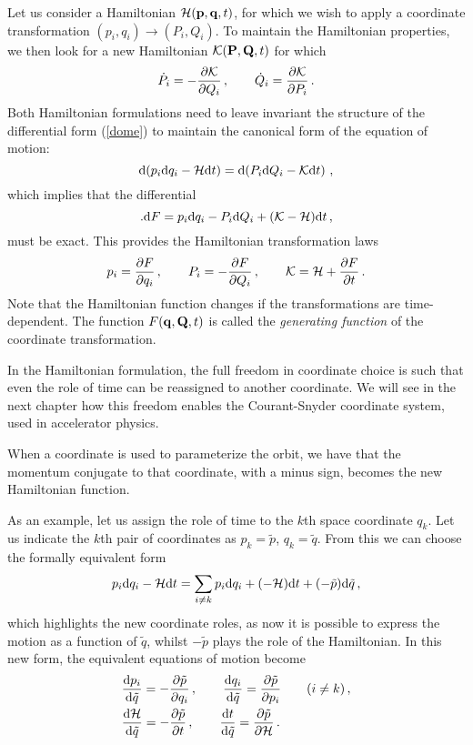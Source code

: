 Let us consider a Hamiltonian $\mathcal{H}(\vb{p},\vb{q},t)$, for which we wish to apply a coordinate transformation $(p_i,q_i)\to(P_i,Q_i)$. To maintain the Hamiltonian properties, we then look for a new Hamiltonian $\mathcal{K}(\vb{P},\vb{Q},t)$ for which
%
\begin{equation}
    \dot P_i = -\pdv{\mathcal{K}}{Q_i}\,, \qquad \dot Q_i = \pdv{\mathcal{K}}{P_i}\,.
\end{equation}
%
Both Hamiltonian formulations need to leave invariant the structure of the differential form (\ref{dome}) to maintain the canonical form of the equation of motion:
%
\begin{equation}
    \dd (p_i \dd q_i- \mathcal{H} \dd t) = \dd(P_i \dd Q_i - \mathcal{K}\dd t)\,,
\end{equation}
%
which implies that the differential
%
\begin{equation}.
    \dd F = p_i\dd q_i - P_i \dd Q_i + (\mathcal{K}-\mathcal{H})\dd t\, ,
\end{equation}
%
must be exact. This provides the Hamiltonian transformation laws
%
\begin{equation} 
	p_i = \pdv{F}{q_i}\,, \qquad P_i = -\pdv{F}{Q_i}\,, \qquad \mathcal{K}=\mathcal{H}+\pdv{F}{t}\,.
\end{equation}
%
Note that the Hamiltonian function changes if the transformations are time-dependent. The function $F(\vb{q},\vb{Q},t)$ is called the \textit{generating function} of the coordinate transformation.

In the Hamiltonian formulation, the full freedom in coordinate choice is such that even the role of time can be reassigned to another coordinate. We will see in the next chapter how this freedom enables the Courant-Snyder coordinate system, used in accelerator physics.

When a coordinate is used to parameterize the orbit, we have that the momentum conjugate to that coordinate, with a minus sign, becomes the new Hamiltonian function.

As an example, let us assign the role of time to the $k$th space coordinate $q_k$. Let us indicate the $k$th pair of coordinates as $p_k = \tilde p$, $q_k=\tilde q$. From this we can choose the formally equivalent form
%
\begin{equation}
    p_i \dd q_i - \mathcal{H} \dd t = \sum_{i\neq k} p_i \dd q_i + (-\mathcal{H})\dd t + (-\tilde p)\dd\tilde q\,,
\end{equation}
%
which highlights the new coordinate roles, as now it is possible to express the motion as a function of $\tilde q$, whilst $-\tilde p$ plays the role of the Hamiltonian. In this new form, the equivalent equations of motion become
%
\begin{equation} 
\begin{split}
	&\dv{p_i}{\tilde q} = -\pdv{\tilde p}{q_i}\,, \qquad \dv{q_i}{\tilde q} = \pdv{\tilde p}{p_i} \qquad (i\neq k)\,, \\
	&\dv{\mathcal{H}}{\tilde q} = -\pdv{\tilde p}{t}\,,  \qquad \dv{t}{\tilde q} = \pdv{\tilde p}{\mathcal{H}}\,. 
\end{split}
\end{equation}

